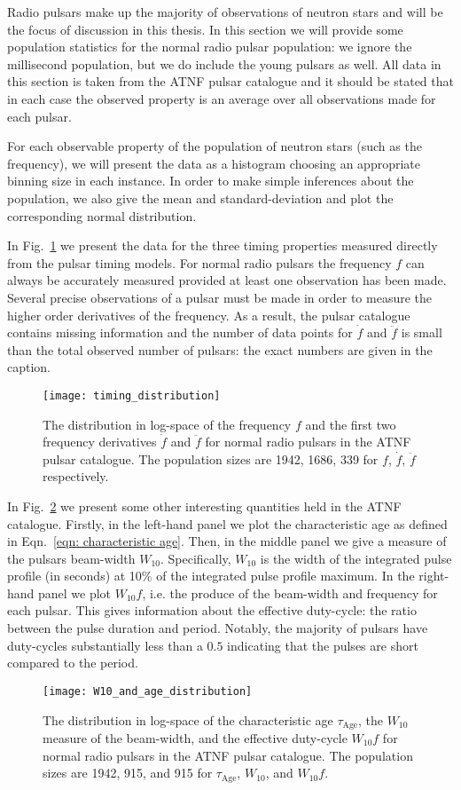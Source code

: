 Radio pulsars make up the majority of observations of neutron stars and will be
the focus of discussion in this thesis. In this section we will provide some
population statistics for the normal radio pulsar population: we ignore the
millisecond population, but we do include the young pulsars as well. All data
in this section is taken from the ATNF pulsar catalogue \citet{ATNF} and it
should be stated that in each case the observed property is an average
over all observations made for each pulsar.

For each observable property of the population of neutron stars (such as the
frequency), we will present the data as a histogram choosing an appropriate
binning size in each instance. In order to make simple inferences about the
population, we also give the mean and standard-deviation and plot the
corresponding normal distribution.

In Fig.~\ref{fig: pop stats timing} we present the data for the three timing
properties measured directly from the pulsar timing models. For normal radio
pulsars the frequency $f$ can always be accurately measured provided at least
one observation has been made.  Several precise observations of a pulsar must
be made in order to measure the higher order derivatives of the frequency. As a
result, the pulsar catalogue contains missing information and the number of
data points for $\dot{f}$ and $\ddot{f}$ is small than the total observed
number of pulsars: the exact numbers are given in the caption.
\begin{figure}[htb]
\centering
\texttt{[image: timing\_distribution]}
\caption{The distribution in log-space of the frequency $f$ and the first two
frequency derivatives $\dot{f}$ and $\ddot{f}$ for normal radio pulsars in the
ATNF pulsar catalogue. The population sizes are 1942, 1686, 339 for $f$,
$\dot{f}$, $\ddot{f}$ respectively.}
\label{fig: pop stats timing}
\end{figure}

In Fig.~\ref{fig: pop stats others} we present some other interesting quantities
held in the ATNF catalogue. Firstly, in the left-hand panel we plot the characteristic
age as defined in Eqn.~\eqref{eqn: characteristic age}. Then, in the middle panel
we give a measure of the pulsars beam-width $W_{10}$. Specifically, $W_{10}$ is
the width of the integrated pulse profile (in seconds) at 10\% of the integrated
pulse profile maximum. In the right-hand panel we  plot $W_{10}f$, i.e. the
produce of the beam-width and frequency for each pulsar. This gives information
about the effective duty-cycle: the ratio between the pulse duration and period.
Notably, the majority of pulsars have duty-cycles substantially less than a
$0.5$ indicating that the pulses are short compared to the period.
\begin{figure}[htb]
\centering
\texttt{[image: W10\_and\_age\_distribution]}
\caption{The distribution in log-space of the characteristic age
$\tau_{\textrm{Age}}$, the $W_{10}$ measure of the beam-width, and the
effective duty-cycle $W_{10} f$ for normal radio pulsars in the
ATNF pulsar catalogue. The population sizes are 1942, 915, and 915 for
$\tau_{\textrm{Age}}$, $W_{10}$, and $W_{10}f$.}
\label{fig: pop stats others}
\end{figure}


